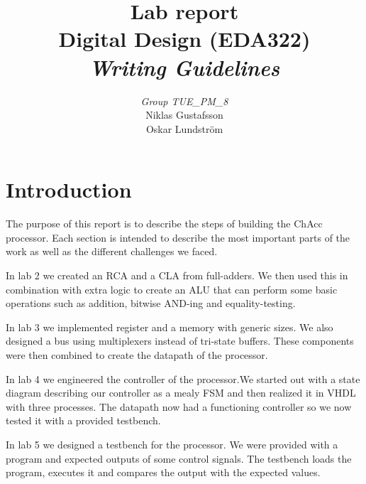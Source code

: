 \documentclass[a4paper,11pt]{article}
\begin{document}
\pagestyle{empty}
\begin{titlepage}

\title{\Huge{Lab report} \\[0.1cm] \Large{Digital Design (EDA322)} \\ [0.4cm] \Large{ \emph{Writing Guidelines}} \\[0.4cm]}
\author{\large{\emph{Group TUE\_PM\_8}} \\[0.2cm] Niklas Gustafsson \\[0.05cm] Oskar Lundström \\[0.1cm]}
\maketitle
\thispagestyle{empty}
\end{titlepage}
\clearpage
\pagestyle{fancyplain}
\tableofcontents
\clearpage
\setcounter{page}{1}
\section{Introduction}

The purpose of this report is to describe the steps of building the ChAcc processor. Each section is intended to describe the most important parts of the work as well as the different challenges we faced.

In lab 2 we created an RCA and a CLA from full-adders. We then used this in combination with extra logic to create an ALU that can perform some basic operations such as addition, bitwise AND-ing and equality-testing.

In lab 3 we implemented register and a memory with generic sizes. We also designed a bus using multiplexers instead of tri-state buffers. These components were then combined to create the datapath of the processor.

In lab 4 we engineered the controller of the processor.We started out with a state diagram describing our controller as a mealy FSM and then realized it in VHDL with three processes. The datapath now had a functioning controller so we now tested it with a provided testbench.

In lab 5 we designed a testbench for the processor. We were provided with a program and expected outputs of some control signals. The testbench loads the program, executes it and compares the output with the expected values.
\end{document}

